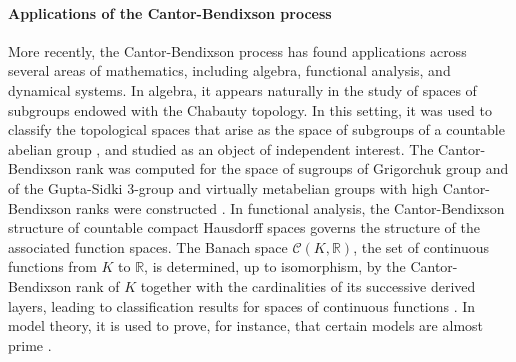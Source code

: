 \documentclass{article}
\newcommand{\comm}[2]{\begin{tcolorbox}[colback=gray!40]\textbf{Comment} (#1) : #2\end{tcolorbox}}
\newcommand\rst{\bgroup\markoverwith{\textcolor{red}{\rule[0.5ex]{2pt}{0.4pt}}}\ULon}
\begin{document}
\paragraph{Applications of the Cantor-Bendixson process} More recently, the Cantor-Bendixson process has found applications across several areas of mathematics, including algebra, functional analysis, and dynamical systems. In algebra, it appears naturally in the study of spaces of subgroups endowed with the Chabauty topology. In this setting, it was used to 
classify the topological spaces that arise as the space of subgroups of a countable abelian group \cite{CornulierGuyotPitsch_SubgroupsAbelian}, and 
{studied as an object of independent interest}. The Cantor-Bendixson rank was computed for the space of sugroups of Grigorchuk group and of the Gupta-Sidki 3-group \cite{skipper2020cantorbendixsonrankgrigorchukgroup} and virtually metabelian groups with high Cantor-Bendixson ranks were constructed \cite{Cornulier_CBRank_Metabelian}. 
In functional analysis, the Cantor-Bendixson structure of countable compact Hausdorff spaces governs the structure of the associated function spaces. The Banach space $\mathcal{C}(K,\mathbb R)$, the set of continuous functions from $K$ to $\mathbb R$, is determined, up to isomorphism, by the Cantor-Bendixson rank of $K$ together with the cardinalities of its successive derived layers, leading to classification results for spaces of continuous functions \cite{BessagaPelczynski1960}. 
In model theory, it is used to prove, for instance, that certain models are almost prime \cite{BazhenovMarchuk2023}.



\end{document}
